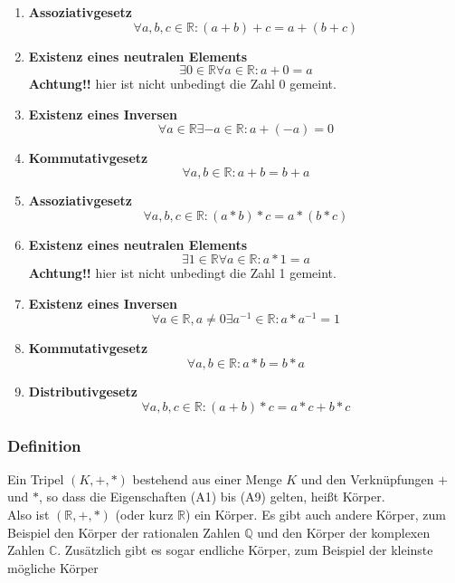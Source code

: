 \documentclass{article}
\begin{document}
\begin{enumerate}[label=(A\arabic*)]
\item \label{axiom:1} \textbf{Assoziativgesetz}
  \[
    \forall a,b,c \in \mathbb{R} \colon (a + b) + c = a + (b + c)
  \]
\item \label{axiom:2} \textbf{Existenz eines neutralen Elements}
  \[
    \exists 0 \in \mathbb{R} \forall a \in \mathbb{R} \colon a + 0 = a
  \]
  \textbf{Achtung!!} hier ist nicht unbedingt die Zahl 0 gemeint.
\item \label{axiom:3} \textbf{Existenz eines Inversen}
  \[
    \forall a \in \mathbb{R} \exists -a \in \mathbb{R} \colon a + (-a) = 0
  \]
\item \label{axiom:4} \textbf{Kommutativgesetz}
  \[
    \forall a,b \in \mathbb{R} \colon a + b = b + a
  \]
\item \label{axiom:5} \textbf{Assoziativgesetz}
  \[
    \forall a,b,c \in \mathbb{R} \colon (a * b) * c = a * (b * c)
  \]
\item \label{axiom:6} \textbf{Existenz eines neutralen Elements}
  \[
    \exists 1 \in \mathbb{R} \forall a \in \mathbb{R} \colon a * 1 = a
  \]
  \textbf{Achtung!!} hier ist nicht unbedingt die Zahl 1 gemeint.
\item \label{axiom:7} \textbf{Existenz eines Inversen}
  \[
    \forall a \in \mathbb{R}, a \ne 0 \exists a^{-1} \in \mathbb{R} \colon a * a^{-1} = 1
  \]
\item \label{axiom:8} \textbf{Kommutativgesetz}
  \[
    \forall a,b \in \mathbb{R} \colon a * b = b * a
  \]
\item \label{axiom:9} \textbf{Distributivgesetz}
  \[
    \forall a,b,c \in \mathbb{R} \colon (a + b) * c = a * c + b * c
  \]
\end{enumerate}

\subsubsection{Definition}

Ein Tripel $(K,+,*)$ bestehend aus einer Menge $K$ und den Verknüpfungen $+$ und $*$, so dass
die Eigenschaften (A1) bis (A9) gelten, heißt Körper. \\

Also ist $(\mathbb{R},+,*)$ (oder kurz $\mathbb{R}$) ein Körper.
Es gibt auch andere Körper, zum Beispiel den Körper der rationalen Zahlen $\mathbb{Q}$ und den Körper
der komplexen Zahlen $\mathbb{C}$.
Zusätzlich gibt es sogar endliche Körper, zum Beispiel der kleinste mögliche Körper
\end{document}
